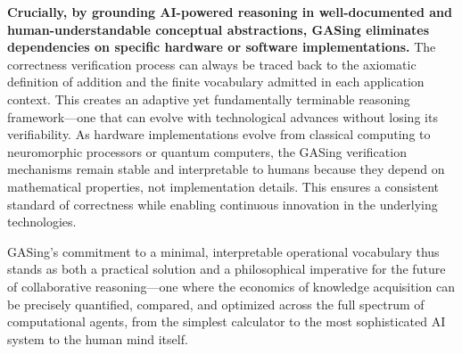\documentclass[11pt,a4paper]{article}
\begin{document}
\textbf{Crucially, by grounding AI-powered reasoning in well-documented and human-understandable conceptual abstractions, GASing eliminates dependencies on specific hardware or software implementations.} The correctness verification process can always be traced back to the axiomatic definition of addition and the finite vocabulary admitted in each application context. This creates an adaptive yet fundamentally terminable reasoning framework—one that can evolve with technological advances without losing its verifiability. As hardware implementations evolve from classical computing to neuromorphic processors or quantum computers, the GASing verification mechanisms remain stable and interpretable to humans because they depend on mathematical properties, not implementation details. This ensures a consistent standard of correctness while enabling continuous innovation in the underlying technologies.

GASing's commitment to a minimal, interpretable operational vocabulary thus stands as both a practical solution and a philosophical imperative for the future of collaborative reasoning—one where the economics of knowledge acquisition can be precisely quantified, compared, and optimized across the full spectrum of computational agents, from the simplest calculator to the most sophisticated AI system to the human mind itself.
\end{document}
